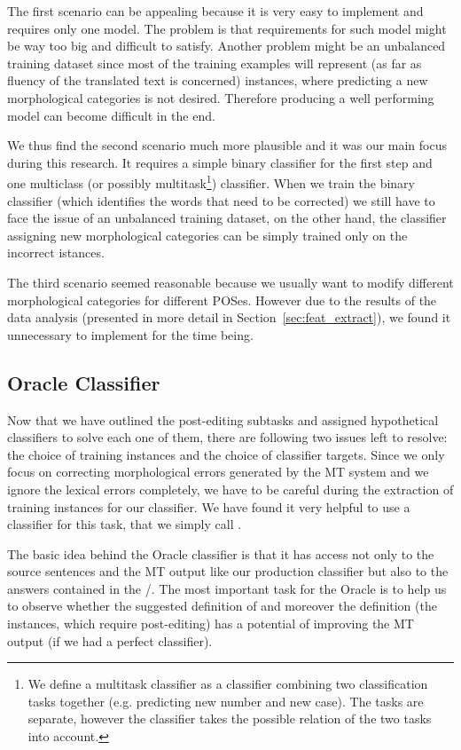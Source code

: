 The first scenario can be appealing because it is very easy to implement and requires only one model.
The problem is that requirements for such model might be way too big and difficult to satisfy. Another
problem might be an unbalanced training dataset since most of the training examples will represent
 (as far as fluency of the translated text is concerned)
instances, where predicting a new morphological categories is not desired. Therefore
producing a well performing model can become difficult in the end.

We thus find the second scenario much more plausible and it was our main focus during this research.
It requires a simple binary classifier for the first step and one multiclass (or possibly multitask\footnote{We
define a multitask classifier as a classifier combining two classification tasks together (e.g. predicting new number and new case).
The tasks are separate, however the classifier takes the possible relation of the two tasks into account.}) classifier.
When we train the binary classifier (which identifies the words that need to be corrected) we still have to face
the issue of an unbalanced training dataset, on the other hand, the classifier assigning new morphological categories
can be simply trained only on the incorrect istances.

The third scenario seemed reasonable because we usually want to modify different morphological categories for different POSes.
However due to the results of the data analysis (presented in more detail in Section~\ref{sec:feat_extract}), we found it unnecessary to implement for the time being.

\subsection{Oracle Classifier}

Now that we have outlined the post-editing subtasks and assigned hypothetical classifiers 
to solve each one of them, there are following two issues left to resolve: the choice of
training instances and the choice of classifier targets. Since we only focus on correcting morphological
errors generated by the MT system and we ignore the lexical errors completely, we have to be careful
during the extraction of training instances for our classifier. We have found it very helpful to
use a  classifier for this task, that we simply call .

The basic idea behind the Oracle classifier is that it has access not only to the
source sentences and the MT output like our production classifier but also to the  answers
contained in the /. The most important
task for the Oracle is to help us to observe whether the suggested definition of  and
moreover the definition  (the instances, which require post-editing)
has a potential of improving the MT output (if we had a perfect classifier).

